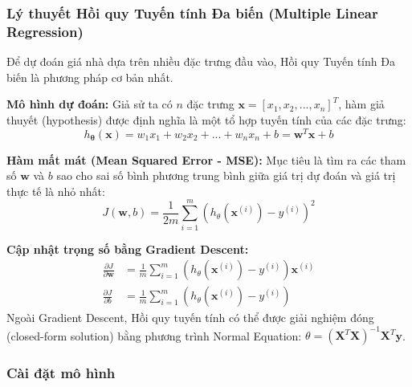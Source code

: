 \subsubsection{Lý thuyết Hồi quy Tuyến tính Đa biến (Multiple Linear Regression)}
Để dự đoán giá nhà dựa trên nhiều đặc trưng đầu vào, Hồi quy Tuyến tính Đa biến là phương pháp cơ bản nhất. 

\textbf{Mô hình dự đoán:}
Giả sử ta có $n$ đặc trưng $\mathbf{x} = [x_1, x_2, ..., x_n]^T$, hàm giả thuyết (hypothesis) được định nghĩa là một tổ hợp tuyến tính của các đặc trưng:
\begin{equation}
h_{\mathbf{\theta}}(\mathbf{x}) = w_1 x_1 + w_2 x_2 + ... + w_n x_n + b = \mathbf{w}^T\mathbf{x} + b
\end{equation}

\textbf{Hàm mất mát (Mean Squared Error - MSE):}
Mục tiêu là tìm ra các tham số $\mathbf{w}$ và $b$ sao cho sai số bình phương trung bình giữa giá trị dự đoán và giá trị thực tế là nhỏ nhất:
\begin{equation}
J(\mathbf{w}, b) = \frac{1}{2m} \sum_{i=1}^{m} \left( h_{\theta}(\mathbf{x}^{(i)}) - y^{(i)} \right)^2
\end{equation}

\textbf{Cập nhật trọng số bằng Gradient Descent:}
\begin{align}
\frac{\partial J}{\partial \mathbf{w}} &= \frac{1}{m} \sum_{i=1}^{m} \left( h_{\theta}(\mathbf{x}^{(i)}) - y^{(i)} \right) \mathbf{x}^{(i)} \\
\frac{\partial J}{\partial b} &= \frac{1}{m} \sum_{i=1}^{m} \left( h_{\theta}(\mathbf{x}^{(i)}) - y^{(i)} \right)
\end{align}
Ngoài Gradient Descent, Hồi quy tuyến tính có thể được giải nghiệm đóng (closed-form solution) bằng phương trình Normal Equation: $\theta = (\mathbf{X}^T\mathbf{X})^{-1}\mathbf{X}^T\mathbf{y}$.

\newpage
\subsubsection{Cài đặt mô hình}

